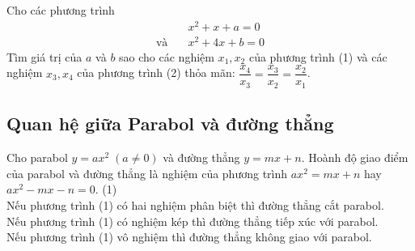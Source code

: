 \begin{vd}Cho các phương trình 
\begin{align*}
&x^2 + x + a = 0 \tag{1}\\ 
\text{và}\quad & x^2 + 4x + b = 0 \tag{2}
\end{align*}
Tìm giá trị của $a$ và $b$ sao cho các nghiệm  $x_1, x_2$ của phương trình (1) và các nghiệm  $x_3, x_4$ của phương trình (2) thỏa mãn:
 $\dfrac{x_4}{x_3} = \dfrac{x_3}{x_2} = \dfrac{x_2}{x_1}$.
\end{vd}

\subsection{Quan hệ giữa Parabol và đường thẳng}
Cho parabol  $y = ax^2 \; (a \ne 0)$ và đường thẳng  $y = mx + n$. Hoành độ giao điểm của parabol và đường thẳng là nghiệm của phương trình  $ax^2 = mx + n$  hay  $ax^2-mx-n=0$. \hfill	(1)\\
Nếu phương trình (1) có hai nghiệm phân biệt thì đường thẳng cắt parabol.\\
Nếu phương trình (1) có nghiệm kép thì đường thẳng tiếp xúc với parabol.\\
Nếu phương trình (1) vô nghiệm thì đường thẳng không giao với parabol.

